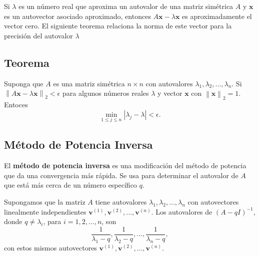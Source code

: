 \documentclass{report}
\numberwithin{subsection}{section} %
\begin{document}
Si $\lambda$ es un número real que aproxima un autovalor de una matriz simétrica $A$ y $\textbf{x}$ es un autovector asociado aproximado, entonces $A\textbf{x} - \lambda\textbf{x}$ es aproximadamente el vector cero. El siguiente teorema relaciona la norma de este vector para la precisión del autovalor $\lambda$

\subsection{\textnormal{Teorema}}

Suponga que $A$ es una matriz simétrica $n\times n$ con autovalores $\lambda_{1}, \lambda_{2}, ..., \lambda_{n}$. Si $\left\| A\textbf{x} - \lambda\textbf{x} \right\|_{2}<\epsilon$ para algunos números reales $\lambda$ y vector $\textbf{x}$ con $\left\| \textbf{x} \right\|_{2} = 1$. Entoces
\begin{equation*}
\min_{1\le j\le n}\left| \lambda_{j}-\lambda \right| < \epsilon.
\end{equation*}

\subsection{\textnormal{Método de Potencia Inversa}}

El \textbf{método de potencia inversa} es una modificación del método de potencia que da una convergencia más rápida. Se usa para determinar el autovalor de $A$ que está más cerca de un número específico $q$.

Supongamos que la matriz $A$ tiene autovalores $\lambda_{1}, \lambda_{2}, ..., \lambda_{n}$ con autovectores linealmente independientes $\textbf{v}^{\left( 1 \right)}, \textbf{v}^{\left( 2 \right)}, ..., \textbf{v}^{\left( n \right)}$. Los autovalores de $\left( A - qI \right)^{-1}$, donde $q\neq \lambda_{i}$, para $i = 1, 2, ..., n$, son
\begin{equation*}
\frac{1}{\lambda_{1} - q}, \frac{1}{\lambda_{2} - q}, ..., \frac{1}{\lambda_{n} - q},
\end{equation*}
con estos mismos autovectores $\textbf{v}^{\left( 1 \right)}, \textbf{v}^{\left( 2 \right)}, ..., \textbf{v}^{\left( n \right)}$.
\end{document}

